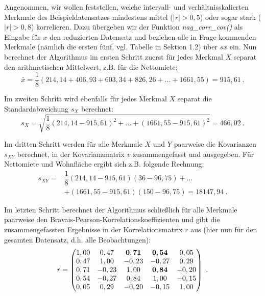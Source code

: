 Angenommen, wir wollen feststellen, welche intervall- und verhältnisskalierten Merkmale des Beispieldatensatzes mindestens mittel ($|r|>0,5$) oder sogar stark ($|r|>0,8$) korrelieren. Dazu übergeben wir der Funktion {\it nag\_corr\_cov()} als Eingabe für $x$ den reduzierten Datensatz und beziehen alle in Frage kommenden Merkmale (nämlich die ersten fünf, vgl. Tabelle in Sektion 1.2) über $sx$ ein. Nun berechnet der Algorithmus im ersten Schritt zuerst für jedes Merkmal $X$ separat den arithmetischen Mittelwert, z.B. für die Nettomiete:
\begin{equation*}
	\bar{x}=\dfrac{1}{8}(214,14+406,93+603,34+826,26+...+1661,55)=915,61 ~.
\end{equation*}

\noindent Im zweiten Schritt wird ebenfalls für jedes Merkmal $X$ separat die Standardabweichung $s_X$ berechnet:
\begin{equation*}
	s_X=\sqrt{\dfrac{1}{8}(214,14-915,61)^2+...+(1661,55-915,61)^2}=466,02 ~.
\end{equation*}

\noindent Im dritten Schritt werden für alle Merkmale $X$ und $Y$ paarweise die Kovarianzen $s_{XY}$ berechnet, in der Kovarianzmatrix $v$ zusammengefasst und ausgegeben. Für Nettomiete und Wohnfläche ergibt sich z.B. folgende Rechnung:
\begin{equation*}
	\begin{split}
		s_{XY}=& \dfrac{1}{8}(214,14-915,61)(36-96,75)+...\\
		& +(1661,55-915,61)(150-96,75)=18147,94 ~.
	\end{split}
\end{equation*}

\noindent Im letzten Schritt berechnet der Algorithmus schließlich für alle Merkmale paarweise den Bravais-Pearson-Korrelationskoeffizienten und gibt die zusammengefassten Ergebnisse in der Korrelationsmatrix $r$ aus (hier nun für den gesamten Datensatz, d.h. alle Beobachtungen):
\begin{equation*}
	r =
	\begin{pmatrix}
		1,00 & 0,47 & {\bf 0,71} & {\bf 0,54} & 0,05\\
 		0,47 & 1,00 & -0,23 & -0,27 & 0,29\\
 		0,71 & -0,23 & 1,00 & {\bf 0,84} & -0,20\\
		0,54 & -0,27 & 0,84 & 1,00 & -0,15\\
  		0,05 &  0,29 & -0,20 & -0,15 & 1,00\\
	\end{pmatrix} ~.
\end{equation*}

